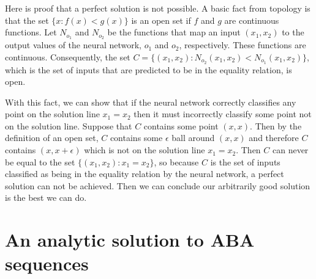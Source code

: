 \documentclass[12pt]{article}
\begin{document}
Here is proof that a perfect solution is not possible. A basic fact from topology is that the set $\{x: f(x) < g(x)\}$ is an open set if $f$ and $g$ are continuous functions. Let $N_{o_1}$ and $N_{o_2}$ be the functions that map an input $(x_1,x_2)$ to the output values of the neural network, $o_1$ and $o_2$, respectively. These functions are continuous. Consequently, the set $C = \{(x_1,x_2): N_{o_2}(x_1,x_2) < N_{o_1}(x_1,x_2)\}$, which is the set of inputs that are predicted to be in the equality relation, is open.

With this fact, we can show that if the neural network correctly classifies any point on the solution line $x_1 = x_2$ then it must incorrectly classify some point not on the solution line. Suppose that $C$ contains some point $(x,x)$. Then by the definition of an open set, $C$ contains some $\epsilon$ ball around $(x,x)$ and therefore $C$ contains $(x,x+\epsilon)$ which is not on the solution line $x_1=x_2$. Then $C$ can never be equal to the set $\{(x_1,x_2):x_1=x_2\}$, so because $C$ is the set of inputs classified as being in the equality relation by the neural network, a perfect solution can not be achieved. Then we can conclude our arbitrarily good solution is the best we can do.



\section{An analytic solution to ABA sequences}\label{sec:analyticlm}

\end{document}
